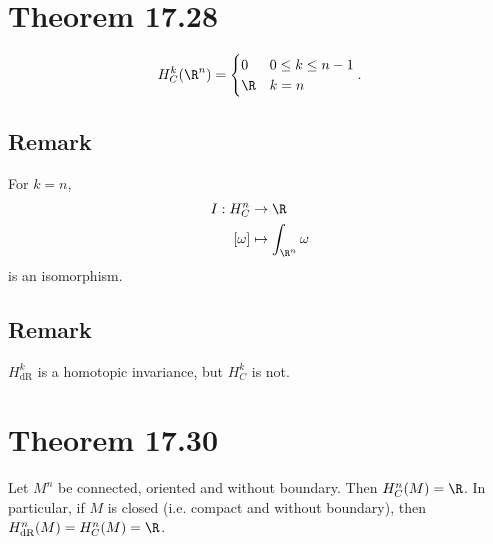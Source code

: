 \documentclass[11pt]{article}
\begin{document}
\section*{Theorem 17.28}
\label{sec:orgb10c07d}
\begin{align*}
  H^{k}_{C}(\R^{n})=
  \begin{cases}
    0 & 0\leq k\leq n-1 \\
    \R & k=n
  \end{cases}.
\end{align*}
\subsection*{Remark}
\label{sec:org394007e}
For \(k=n\),\\
\begin{align*}
  I:H^{n}_{C}&\to\R\\
  [\omega]&\mapsto\int_{\R^{n}}\omega
\end{align*}
is an isomorphism.\\
\subsection*{Remark}
\label{sec:org0c81a4a}
\(H^{k}_{\text{dR}}\) is a homotopic invariance, but \(H^{k}_{C}\) is not.\\
\section*{Theorem 17.30}
\label{sec:orgda746d7}
Let \(M^{n}\) be connected, oriented and without boundary. Then \(H_{C}^{n}(M)=\R\). In particular, if \(M\) is closed (i.e. compact and without boundary), then \(H_{\text{dR}}^{n}(M)=H^{n}_{C}(M)=\R\).\\
\end{document}
